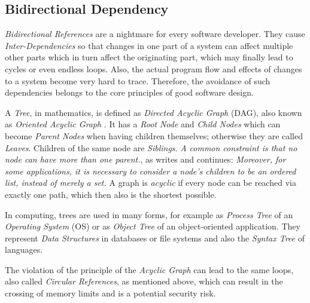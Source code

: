 %
%
%
%
%
%
%

\subsection{Bidirectional Dependency}
\label{bidirectional_dependency_heading}

\emph{Bidirectional References} are a nightmare for every software developer.
They cause \emph{Inter-Dependencies} so that changes in one part of a system can
affect multiple other parts which in turn affect the originating part, which may
finally lead to cycles or even endless loops. Also, the actual program flow and
effects of changes to a system become very hard to trace. Therefore, the avoidance
of such dependencies belongs to the core principles of good software design.

A \emph{Tree}, in mathematics, is defined as \textit{Directed Acyclic Graph}
(DAG), also known as \emph{Oriented Acyclic Graph} \cite{nist}. It has a
\emph{Root Node} and \emph{Child Nodes} which can become \emph{Parent Nodes}
when having children themselves; otherwise they are called \emph{Leaves}.
Children of the same node are \emph{Siblings}. \textit{A common constraint is
that no node can have more than one parent.}, as \cite{foldoc} writes and
continues: \textit{Moreover, for some applications, it is necessary to consider
a node's children to be an ordered list, instead of merely a set.} A graph is
\emph{acyclic} if every node can be reached via exactly one path, which then
also is the shortest possible.

In computing, trees are used in many forms, for example as \emph{Process Tree}
of an \emph{Operating System} (OS) or as \emph{Object Tree} of an object-oriented
application. They represent \emph{Data Structures} in databases or file systems
and also the \emph{Syntax Tree} of languages.

The violation of the principle of the \emph{Acyclic Graph} can lead to the same
loops, also called \emph{Circular References}, as mentioned above, which can
result in the crossing of memory limits and is a potential security risk.
